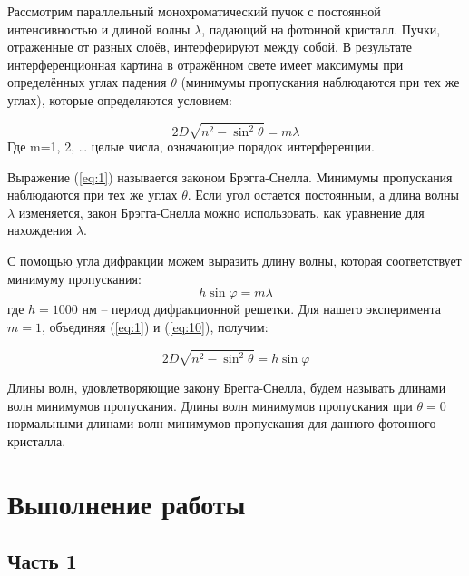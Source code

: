 \documentclass[a4paper, 12pt]{article}
\renewcommand{\phi}{\varphi} %
\begin{document}
Рассмотрим параллельный монохроматический пучок с постоянной интенсивностью и длиной волны $\lambda$, падающий на фотонной кристалл. Пучки, отраженные от разных слоёв, интерферируют между собой. В результате интерференционная картина в отражённом свете имеет максимумы при определённых углах падения $\theta$ (минимумы пропускания наблюдаются при тех же углах), которые определяются условием:

\begin{equation}
2D\sqrt{n^2-\sin^2 \theta} = m\lambda
\label{eq:1}
\end{equation}
Где m=1, 2, … целые числа, означающие порядок интерференции.

Выражение (\ref{eq:1}) называется законом Брэгга-Снелла. Минимумы пропускания наблюдаются при тех же углах $\theta$. Если угол остается постоянным, а длина волны $\lambda$ изменяется, закон Брэгга-Снелла можно использовать, как уравнение для нахождения $\lambda$. 

С помощью угла дифракции можем выразить длину волны, которая соответствует минимуму пропускания: 
\begin{equation}
h\sin\phi = m\lambda
\label{eq:10}
\end{equation}
где $h = 1000$ нм -- период дифракционной решетки. Для нашего эксперимента $m=1$, объединяя (\ref{eq:1}) и (\ref{eq:10}), получим:

\begin{equation}
2D\sqrt{n^2-\sin^2 \theta} =h \sin\phi
\label{eq:11}
\end{equation}



Длины волн, удовлетворяющие закону Брегга-Снелла, будем называть длинами волн минимумов пропускания. Длины волн минимумов пропускания при $\theta=0$ нормальными длинами волн минимумов пропускания для данного фотонного кристалла.

\section{Выполнение работы}
\subsection{Часть 1}
\end{document}
